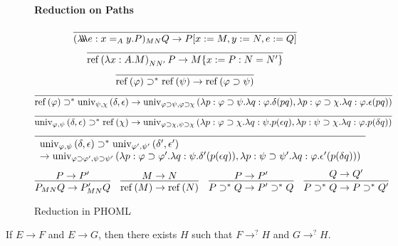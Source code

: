 \documentclass[a4paper,UKenglish]{lipics-v2016}
\newcommand*{\reff}[1]{\ensuremath{\mathrm{ref} \left( {#1} \right)}}
\newcommand*{\univ}[4]{\ensuremath{\mathrm{univ}_{{#1}, {#2}} \left({#3} , {#4} \right)}}
\newcommand*{\triplelambda}{\ensuremath{\lambda \!\! \lambda \!\! \lambda}}
\theoremstyle{plain}
\theoremstyle{definition}
\begin{document}
\begin{definition}
\begin{figure}
\paragraph*{Reduction on Paths}
$$\infer{(\triplelambda e:x =_A y.P)_{MN} Q \rightarrow P [x := M, y := N, e := Q]}{} $$
$$ \infer{\reff{\lambda x:A.M}_{N N'} P \rightarrow M \{ x:=P : N = N' \}}{} $$
$$ \infer{\reff{\varphi} \supset^* \reff{\psi} \rightarrow \reff{\varphi \supset \psi}}{} $$
$$ \infer{\reff{\varphi} \supset^* \univ{\psi}{\chi}{\delta}{\epsilon} \rightarrow 
\univ{\varphi \supset \psi}{\varphi \supset \chi}{\lambda p:\varphi \supset \psi. \lambda q : \varphi. \delta (pq)}{\lambda p : \varphi \supset \chi. \lambda q : \varphi. \epsilon (pq)}}{} $$
$$ \infer{\univ{\varphi}{\psi}{\delta}{\epsilon} \supset^* \reff{\chi} \rightarrow
\univ{\varphi \supset \chi}{\psi \supset \chi}{\lambda p : \varphi \supset \chi. \lambda q : \psi. p (\epsilon q)}{\lambda p:\psi \supset \chi. \lambda q : \varphi. p(\delta q)}}{} $$
$$ \infer{\begin{array}{l}
\univ{\varphi}{\psi}{\delta}{\epsilon} \supset^* \univ{\varphi'}{\psi'}{\delta'}{\epsilon'} \\
 \rightarrow
\univ{\varphi \supset \varphi'}{\psi \supset \psi'}{\lambda p : \varphi \supset \varphi'. \lambda q : \psi. \delta' (p(\epsilon q))}{\lambda p : \psi \supset \psi'. \lambda q : \varphi. \epsilon' (p (\delta q))}
\end{array}}{} $$
$$ \infer{P_{MN} Q \rightarrow P'_{MN} Q}{P \rightarrow P'} \quad
\infer{\reff{M} \rightarrow \reff{N}}{M \rightarrow N} \quad
\infer{P \supset^* Q \rightarrow P' \supset^* Q}{P \rightarrow P'} \quad
\infer{P \supset^* Q \rightarrow P \supset^* Q'}{Q \rightarrow Q'} $$
\caption{Reduction in PHOML}
\label{fig:reduction}
\end{figure}
\end{definition}

\begin{lemma}
\label{lm:diamond}
If $E \rightarrow F$ and $E \rightarrow G$, then there exists $H$ such that $F \rightarrow^? H$ and $G \rightarrow^? H$.
\end{lemma}
\end{document}
